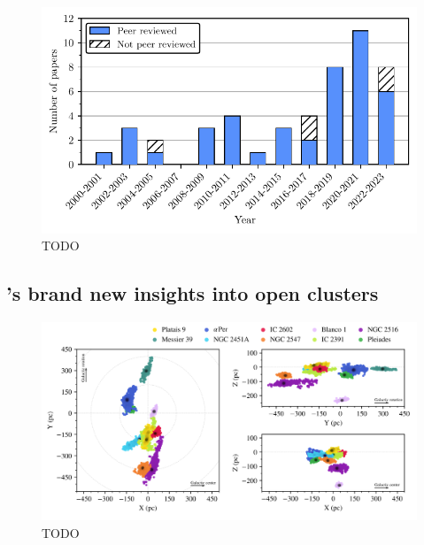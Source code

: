 \begin{figure}[tb]
	\includegraphics[width=\textwidth]{fig/c1/papers.pdf}
	\caption{TODO}
	\label{fig:intro:history:papers}
\end{figure}


\subsection{\gaia's brand new insights into open clusters}
\label{sec:intro:gaia:insights}

\begin{figure}[tb]
	\includegraphics[width=\textwidth]{fig/c1/meingast_tidal_tails.png}
	\caption[TODO]{TODO}
	\label{fig:intro:gaia:comas}
\end{figure}

